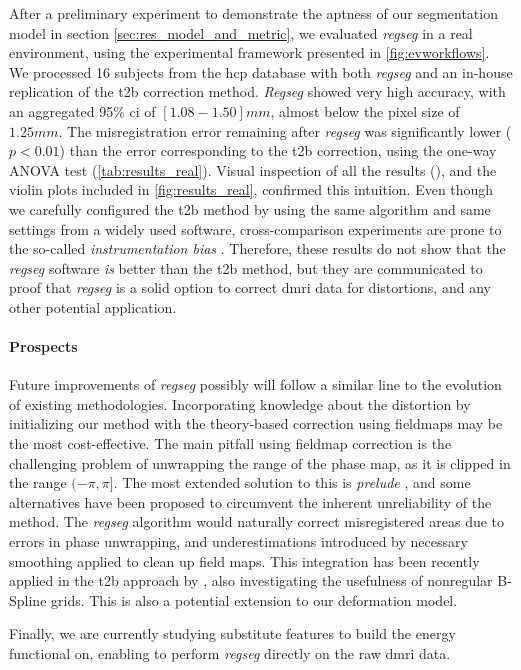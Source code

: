 After a preliminary experiment to demonstrate the aptness of our segmentation model
  in section \autoref{sec:res_model_and_metric}, we evaluated \emph{regseg} in
  a real environment, using the experimental framework presented in \autoref{fig:evworkflows}.
We processed 16 subjects from the \gls*{hcp} database with both \emph{regseg}
  and an in-house replication of the \gls*{t2b} correction method.
\emph{Regseg} showed very high accuracy, with an aggregated 95\% \gls*{ci} of $[1.08-1.50]mm$,
  almost below the pixel size of $1.25mm$.
The misregistration error remaining after \emph{regseg} was significantly lower ($p < 0.01$) than the
  error corresponding to the \gls*{t2b} correction, using the one-way ANOVA test
  (\autoref{tab:results_real}).
Visual inspection of all the results (), and the violin plots included in
  \autoref{fig:results_real}, confirmed this intuition.
Even though we carefully configured the \gls*{t2b} method by using the same algorithm and
  same settings from a widely used software, cross-comparison experiments are prone to
  the so-called \emph{instrumentation bias} \citep{tustison_instrumentation_2013}.
Therefore, these results do not show that the \emph{regseg} software \emph{is} better than the
  \gls*{t2b} method, but they are communicated to proof that \emph{regseg} is a solid option to
  correct \gls*{dmri} data for distortions, and any other potential application.

\paragraph*{Prospects}
Future improvements of \emph{regseg} possibly will follow a similar line to the evolution of 
  existing methodologies.
Incorporating knowledge about the distortion by initializing our method with the theory-based
  correction using fieldmaps may be the most cost-effective.
The main pitfall using fieldmap correction is the challenging problem of unwrapping the
  range of the phase map, as it is clipped in the range $(-\pi, \pi]$.
The most extended solution to this is \emph{prelude} \citep{jenkinson_fast_2003}, and some
  alternatives have been proposed \citep{zhou_reliable_2009,daga_susceptibility_2014} to
  circumvent the inherent unreliability of the method.
The \emph{regseg} algorithm would naturally correct misregistered areas due to errors in
  phase unwrapping, and underestimations introduced by necessary smoothing
  applied to clean up field maps.
This integration has been recently applied in the \gls*{t2b} approach
  by \cite{irfanoglu_susceptibility_2011}, also investigating the usefulness of
  nonregular B-Spline grids.
This is also a potential extension to our deformation model.

Finally, we are currently studying substitute features to build the energy functional on,
  enabling to perform \emph{regseg} directly on the raw \gls*{dmri} data.